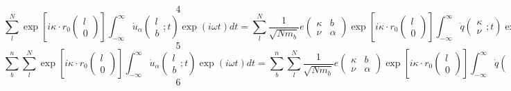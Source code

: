 \documentclass{article}
\begin{document}
\[4\]
\[\sum _{l}^{N}\exp \left[i\kappa \cdot r_{0} (\begin{array}{c} {l} \\ {0} \end{array})\right]\int _{-\infty }^{\infty }\dot{u}_{\alpha } \left(\begin{array}{c} {l} \\ {b} \end{array};t\right)\exp (i\omega t)dt  =\sum _{l}^{N}\frac{1}{\sqrt{Nm_{b} } } e\left(\begin{array}{cc} {\kappa } & {b} \\ {\nu } & {\alpha } \end{array}\right)\exp \left[i\kappa \cdot r_{0} (\begin{array}{c} {l} \\ {0} \end{array})\right] \int _{-\infty }^{\infty }\dot{q}\left(\begin{array}{c} {\kappa } \\ {\nu } \end{array};t\right)\exp (i\omega t)dt \]
\[5\]
\[\sum _{b}^{n}\sum _{l}^{N}\exp \left[i\kappa \cdot r_{0} (\begin{array}{c} {l} \\ {0} \end{array})\right]\int _{-\infty }^{\infty }\dot{u}_{\alpha } \left(\begin{array}{c} {l} \\ {b} \end{array};t\right)\exp (i\omega t)dt   =\sum _{b}^{n}\sum _{l}^{N}\frac{1}{\sqrt{Nm_{b} } } e\left(\begin{array}{cc} {\kappa } & {b} \\ {\nu } & {\alpha } \end{array}\right)\exp \left[i\kappa \cdot r_{0} (\begin{array}{c} {l} \\ {0} \end{array})\right] \int _{-\infty }^{\infty }\dot{q}\left(\begin{array}{c} {\kappa } \\ {\nu } \end{array};t\right)\exp (i\omega t)dt  \]
\[6\]
\end{document}
